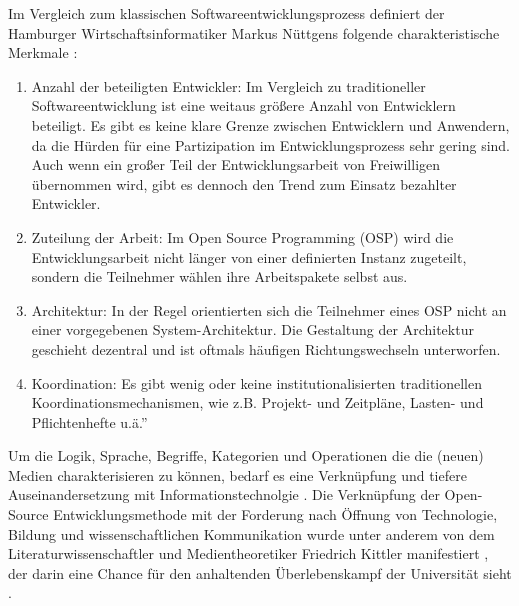 Im Vergleich zum klassischen Softwareentwicklungsprozess definiert der Hamburger Wirtschaftsinformatiker Markus Nüttgens folgende charakteristische Merkmale \cite{nuttgens_2014}:
\begin{enumerate}
\item Anzahl der beteiligten Entwickler: Im Vergleich zu traditioneller Softwareentwicklung ist eine weitaus größere Anzahl von Entwicklern beteiligt. Es gibt es keine klare Grenze zwischen Entwicklern und Anwendern, da die Hürden für eine Partizipation im Entwicklungsprozess sehr gering sind. Auch wenn ein großer Teil der Entwicklungsarbeit von Freiwilligen übernommen wird, gibt es dennoch den Trend zum Einsatz bezahlter Entwickler.
\item Zuteilung der Arbeit: Im Open Source Programming (OSP) wird die Entwicklungsarbeit nicht länger von einer definierten Instanz zugeteilt, sondern die Teilnehmer wählen ihre Arbeitspakete selbst aus.
\item Architektur: In der Regel orientierten sich die Teilnehmer eines OSP nicht an einer vorgegebenen System-Architektur. Die Gestaltung der Architektur geschieht dezentral und ist oftmals häufigen Richtungswechseln unterworfen.
\item Koordination: Es gibt wenig oder keine institutionalisierten traditionellen Koordinationsmechanismen, wie z.B. Projekt- und Zeitpläne, Lasten- und Pflichtenhefte u.ä.” \cite{suchen}
\end{enumerate}

Um die Logik, Sprache, Begriffe, Kategorien und Operationen die die (neuen) Medien charakterisieren zu können, bedarf es eine Verknüpfung und tiefere Auseinandersetzung mit Informationstechnolgie \cite[:65]{manovich_2001_language}. Die Verknüpfung der Open-Source Entwicklungsmethode mit der Forderung nach Öffnung von Technologie, Bildung und wissenschaftlichen Kommunikation wurde unter anderem von dem Literaturwissenschaftler und Medientheoretiker Friedrich Kittler manifestiert \cite{cite:1}, der darin eine Chance für den anhaltenden Überlebenskampf der Universität sieht \cite[:7]{chun_2006_new}.

